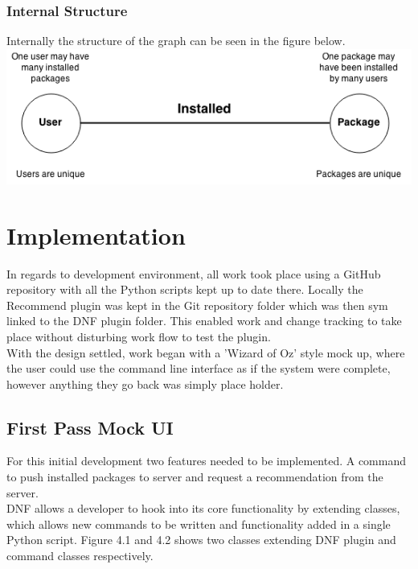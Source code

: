 \documentclass{l4proj}
\begin{document}
\subsection{Internal Structure}
Internally the structure of the graph can be seen in the figure below.
\vspace{10 px}\\
\includegraphics[scale=0.9]{images/recommend_graph.png}

 
 
\chapter{Implementation}
In regards to development environment, all work took place using a GitHub repository with all the Python scripts kept up to date there. Locally the Recommend plugin was kept in the Git repository folder which was then sym linked to the DNF plugin folder. This enabled work and change tracking to take place without disturbing work flow to test the plugin.\\
With the design settled, work began with a 'Wizard of Oz' style mock up, where the user could use the command line interface as if the system were complete, however anything they go back was simply place holder.

\section{First Pass Mock UI}
For this initial development two features needed to be implemented. A command to push installed packages to server and request a recommendation from the server.\\
DNF allows a developer to hook into its core functionality by extending classes, which allows new commands to be written and functionality added in a single Python script. Figure 4.1 and 4.2 shows two classes extending DNF plugin and command classes respectively.
\begin{figure}

\end{figure}
\begin{figure}

\end{figure}
\end{document}
